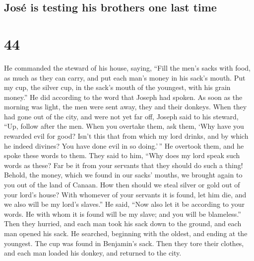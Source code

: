 \begin{paracol}{2}
\switchcolumn
\begin{otherlanguage}{english}

\hypertarget{josuxe9-is-testing-his-brothers-one-last-time}{%
\subsection{José is testing his brothers one last
time}\label{josuxe9-is-testing-his-brothers-one-last-time}}

\hypertarget{section-87}{%
\section{44}\label{section-87}}

 He commanded the steward of his house, saying, ``Fill the
men's sacks with food, as much as they can carry, and put each man's
money in his sack's mouth.  Put my cup, the silver cup, in
the sack's mouth of the youngest, with his grain money.'' He did
according to the word that Joseph had spoken.  As soon as
the morning was light, the men were sent away, they and their donkeys.
 When they had gone out of the city, and were not yet far
off, Joseph said to his steward, ``Up, follow after the men. When you
overtake them, ask them, `Why have you rewarded evil for good?
 Isn't this that from which my lord drinks, and by which
he indeed divines? You have done evil in so doing.'\,'' 
He overtook them, and he spoke these words to them.  They
said to him, ``Why does my lord speak such words as these? Far be it
from your servants that they should do such a thing! 
Behold, the money, which we found in our sacks' mouths, we brought again
to you out of the land of Canaan. How then should we steal silver or
gold out of your lord's house?  With whomever of your
servants it is found, let him die, and we also will be my lord's
slaves.''  He said, ``Now also let it be according to
your words. He with whom it is found will be my slave; and you will be
blameless.''  Then they hurried, and each man took his
sack down to the ground, and each man opened his sack. 
He searched, beginning with the oldest, and ending at the youngest. The
cup was found in Benjamin's sack.  Then they tore their
clothes, and each man loaded his donkey, and returned to the city.

\hypertarget{the-brothers-return-to-the-city-and-humble-themselves-before-joseph}{%
}
\end{otherlanguage}
\end{paracol}
